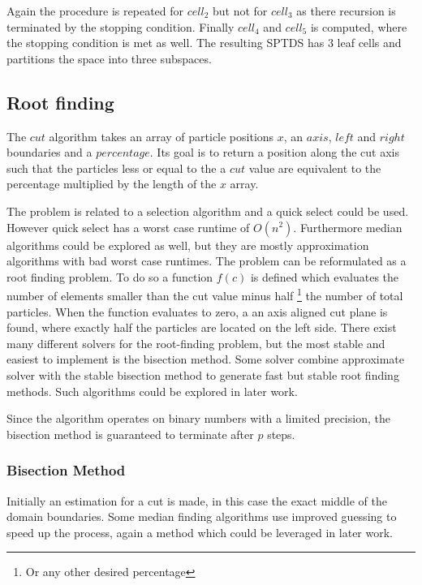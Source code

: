 \documentclass[]{article}
\begin{document}
Again the procedure is repeated for $cell_2$ but not for $cell_3$ as there recursion is terminated by the stopping condition. Finally $cell_4$ and $cell_5$ is computed, where the stopping condition is met as well. The resulting SPTDS has 3 leaf cells and partitions the space into three subspaces.


\subsection{Root finding} \label{sec:root}


The $cut$ algorithm takes an array of particle positions $x$, an $axis$, $left$ and $right$ boundaries and a $percentage$. Its goal is to return a position along the cut axis such that the particles less or equal to the a $cut$ value are equivalent to the percentage multiplied by the length of the $x$ array.

The problem is related to a selection algorithm and a quick select\cite{algorithms} could be used. However quick select has a worst case runtime of $O(n^2)$. Furthermore median algorithms could be explored as well, but they are mostly approximation algorithms with bad worst case runtimes. The problem can be reformulated as a root finding problem. To do so a function $f(c)$ is defined which evaluates the number of elements smaller than the cut value minus half \footnote{Or any other desired percentage} the number of total particles. When the function evaluates to zero, a an axis aligned cut plane is found, where exactly half the particles are located on the left side. There exist many different solvers for the root-finding problem, but the most stable and easiest to implement is the bisection method. Some solver combine approximate solver with the stable bisection method to generate fast but stable root finding methods. Such algorithms could be explored in later work.

Since the algorithm operates on binary numbers with a limited precision, the bisection method is guaranteed to terminate after $p$ steps.

\subsubsection{Bisection Method}

Initially an estimation for a cut is made, in this case the exact middle of the domain boundaries. Some median finding algorithms use improved guessing to speed up the process, again a method which could be leveraged in later work. 
\end{document}
